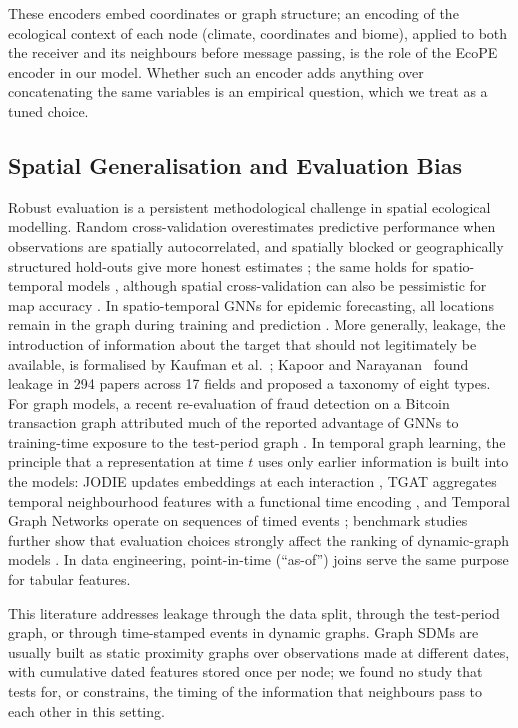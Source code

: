 \documentclass[a4paper,fleqn]{cas-sc}
\begin{document}
These encoders embed coordinates or graph structure; an encoding of the ecological context of each node (climate, coordinates and biome), applied to both the receiver and its neighbours before message passing, is the role of the EcoPE encoder in our model. Whether such an encoder adds anything over concatenating the same variables is an empirical question, which we treat as a tuned choice.

\subsection{Spatial Generalisation and Evaluation Bias}

Robust evaluation is a persistent methodological challenge in spatial ecological modelling. Random cross-validation overestimates predictive performance when observations are spatially autocorrelated, and spatially blocked or geographically structured hold-outs give more honest estimates \citep{roberts2017,hijmans2012,valavi2019,ploton2020}; the same holds for spatio-temporal models \citep{meyer2018}, although spatial cross-validation can also be pessimistic for map accuracy \citep{wadoux2021}. In spatio-temporal GNNs for epidemic forecasting, all locations remain in the graph during training and prediction \citep[e.g.][]{croft2023}. More generally, leakage, the introduction of information about the target that should not legitimately be available, is formalised by Kaufman et al.~\citep{kaufman2012}; Kapoor and Narayanan~\citep{kapoor2023} found leakage in 294 papers across 17 fields and proposed a taxonomy of eight types. For graph models, a recent re-evaluation of fraud detection on a Bitcoin transaction graph attributed much of the reported advantage of GNNs to training-time exposure to the test-period graph \citep{maganti2026}. In temporal graph learning, the principle that a representation at time $t$ uses only earlier information is built into the models: JODIE updates embeddings at each interaction \citep{kumar2019}, TGAT aggregates temporal neighbourhood features with a functional time encoding \citep{xu2020tgat}, and Temporal Graph Networks operate on sequences of timed events \citep{rossi2020}; benchmark studies further show that evaluation choices strongly affect the ranking of dynamic-graph models \citep{poursafaei2022,huang2023}. In data engineering, point-in-time (``as-of'') joins serve the same purpose for tabular features.

This literature addresses leakage through the data split, through the test-period graph, or through time-stamped events in dynamic graphs. Graph SDMs are usually built as static proximity graphs over observations made at different dates, with cumulative dated features stored once per node; we found no study that tests for, or constrains, the timing of the information that neighbours pass to each other in this setting.
\end{document}
